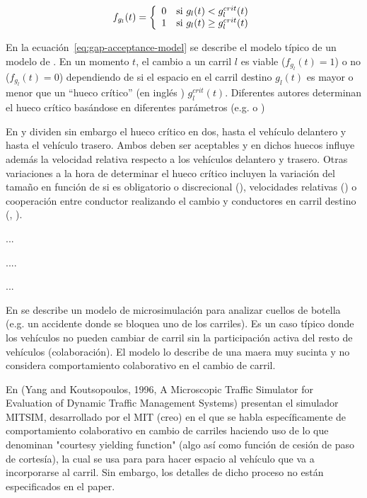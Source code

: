 \begin{equation}
f_{g_l}(t) = \twopartf {0} {g_l(t) < g^{crit}_l(t)} {1} {g_l(t) \geq g^{crit}_l(t)}
\label{eq:gap-acceptance-model}
\end{equation}

En la ecuación~\ref{eq:gap-acceptance-model} se describe el modelo típico de un modelo de . En un momento $t$, el cambio a un carril $l$ es viable ($f_{g_l}(t) = 1$) o no ($f_{g_l}(t) = 0$) dependiendo de si el espacio en el carril destino $g_l(t)$ es mayor o menor que un \enquote{hueco crítico} (en inglés ) $g^{crit}_l(t)$. Diferentes autores determinan el hueco crítico basándose en diferentes parámetros (e.g. \cite{Miller1972} o \cite{Cassidy1995})

En \cite{Gipps1986} y \cite{Ahmed1996} dividen sin embargo el hueco crítico en dos, hasta el vehículo delantero y hasta el vehículo trasero. Ambos deben ser aceptables y en dichos huecos influye además la velocidad relativa respecto a los vehículos delantero y trasero. Otras variaciones a la hora de determinar el hueco crítico incluyen la variación del tamaño en función de si es obligatorio o discrecional (\cite{Toledo2003}), velocidades relativas (\cite{Ahmed1999}) o cooperación entre conductor realizando el cambio y conductores en carril destino (\cite{Ahmed1999}, \cite{Hidas2002}).

...


....

...

En \cite{Fritzsche1994} se describe un modelo de microsimulación para analizar cuellos de botella (e.g. un accidente donde se bloquea uno de los carriles). Es un caso típico donde los vehículos no pueden cambiar de carril sin la participación activa del resto de vehículos (colaboración). El modelo lo describe de una maera muy sucinta y no considera comportamiento colaborativo en el cambio de carril.

En (Yang and Koutsopoulos, 1996, A Microscopic Traffic Simulator for Evaluation of Dynamic Traffic Management Systems) presentan el simulador MITSIM, desarrollado por el MIT (creo) en el que se habla específicamente de comportamiento colaborativo en cambio de carriles haciendo uso de lo que denominan "courtesy yielding function" (algo así como función de cesión de paso de cortesía), la cual se usa para para hacer espacio al vehículo que va a incorporarse al carril. Sin embargo, los detalles de dicho proceso no están especificados en el paper.

